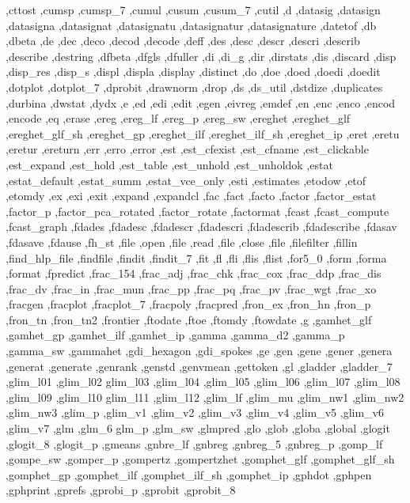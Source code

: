 {{    ,cttost ,cumsp ,cumsp_7 ,cumul ,cusum ,cusum_7 ,cutil ,d ,datasig
    ,datasign ,datasigna ,datasignat ,datasignatu ,datasignatur
    ,datasignature ,datetof ,db ,dbeta ,de ,dec ,deco ,decod ,decode
    ,deff ,des ,desc ,descr ,descri ,describ ,describe ,destring
    ,dfbeta ,dfgls ,dfuller ,di ,di_g ,dir ,dirstats ,dis ,discard
    ,disp ,disp_res ,disp_s ,displ ,displa ,display ,distinct ,do
    ,doe ,doed ,doedi ,doedit ,dotplot ,dotplot_7 ,dprobit ,drawnorm
    ,drop ,ds ,ds_util ,dstdize ,duplicates ,durbina ,dwstat ,dydx ,e
    ,ed ,edi ,edit ,egen ,eivreg ,emdef ,en ,enc ,enco ,encod ,encode
    ,eq ,erase ,ereg ,ereg_lf ,ereg_p ,ereg_sw ,ereghet ,ereghet_glf
    ,ereghet_glf_sh ,ereghet_gp ,ereghet_ilf ,ereghet_ilf_sh ,ereghet_ip
    ,eret ,eretu ,eretur ,ereturn ,err ,erro ,error ,est ,est_cfexist
    ,est_cfname ,est_clickable ,est_expand ,est_hold ,est_table
    ,est_unhold ,est_unholdok ,estat ,estat_default ,estat_summ
    ,estat_vce_only ,esti ,estimates ,etodow ,etof ,etomdy ,ex ,exi
    ,exit ,expand ,expandcl ,fac ,fact ,facto ,factor ,factor_estat
    ,factor_p ,factor_pca_rotated ,factor_rotate ,factormat ,fcast
    ,fcast_compute ,fcast_graph ,fdades ,fdadesc ,fdadescr ,fdadescri
    ,fdadescrib ,fdadescribe ,fdasav ,fdasave ,fdause ,fh_st ,file
    ,open ,file ,read ,file ,close ,file ,filefilter ,fillin
    ,find_hlp_file ,findfile ,findit ,findit_7 ,fit ,fl ,fli ,flis
    ,flist ,for5_0 ,form ,forma ,format ,fpredict ,frac_154 ,frac_adj
    ,frac_chk ,frac_cox ,frac_ddp ,frac_dis ,frac_dv ,frac_in ,frac_mun
    ,frac_pp ,frac_pq ,frac_pv ,frac_wgt ,frac_xo ,fracgen ,fracplot
    ,fracplot_7 ,fracpoly ,fracpred ,fron_ex ,fron_hn ,fron_p ,fron_tn
    ,fron_tn2 ,frontier ,ftodate ,ftoe ,ftomdy ,ftowdate ,g ,gamhet_glf
    ,gamhet_gp ,gamhet_ilf ,gamhet_ip ,gamma ,gamma_d2 ,gamma_p
    ,gamma_sw ,gammahet ,gdi_hexagon ,gdi_spokes ,ge ,gen ,gene ,gener
    ,genera ,generat ,generate ,genrank ,genstd ,genvmean ,gettoken
    ,gl ,gladder ,gladder_7 ,glim_l01 ,glim_l02 glim_l03 ,glim_l04
    ,glim_l05 ,glim_l06 ,glim_l07 ,glim_l08 ,glim_l09 ,glim_l10 glim_l11
    ,glim_l12 ,glim_lf ,glim_mu ,glim_nw1 ,glim_nw2 ,glim_nw3 ,glim_p
    ,glim_v1 ,glim_v2 ,glim_v3 ,glim_v4 ,glim_v5 ,glim_v6 ,glim_v7 ,glm
    ,glm_6 glm_p ,glm_sw ,glmpred ,glo ,glob ,globa ,global ,glogit
    ,glogit_8 ,glogit_p ,gmeans ,gnbre_lf ,gnbreg ,gnbreg_5 ,gnbreg_p
    ,gomp_lf ,gompe_sw ,gomper_p ,gompertz ,gompertzhet ,gomphet_glf
    ,gomphet_glf_sh ,gomphet_gp ,gomphet_ilf ,gomphet_ilf_sh ,gomphet_ip
    ,gphdot ,gphpen ,gphprint ,gprefs ,gprobi_p ,gprobit ,gprobit_8
}}
